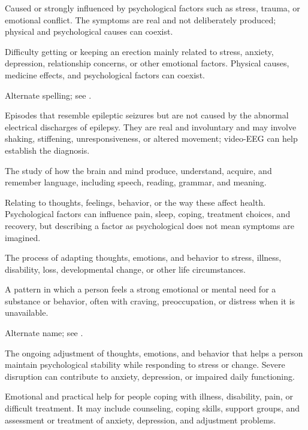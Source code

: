  Caused or strongly influenced by psychological factors such as stress, trauma, or emotional conflict. The symptoms are real and not deliberately produced; physical and psychological causes can coexist.

 Difficulty getting or keeping an erection mainly related to stress, anxiety, depression, relationship concerns, or other emotional factors. Physical causes, medicine effects, and psychological factors can coexist.

 Alternate spelling; see .

 Episodes that resemble epileptic seizures but are not caused by the abnormal electrical discharges of epilepsy. They are real and involuntary and may involve shaking, stiffening, unresponsiveness, or altered movement; video-EEG can help establish the diagnosis.

 The study of how the brain and mind produce, understand, acquire, and remember language, including speech, reading, grammar, and meaning.

 Relating to thoughts, feelings, behavior, or the way these affect health. Psychological factors can influence pain, sleep, coping, treatment choices, and recovery, but describing a factor as psychological does not mean symptoms are imagined.

 The process of adapting thoughts, emotions, and behavior to stress, illness, disability, loss, developmental change, or other life circumstances.

 A pattern in which a person feels a strong emotional or mental need for a substance or behavior, often with craving, preoccupation, or distress when it is unavailable.

 Alternate name; see .

 The ongoing adjustment of thoughts, emotions, and behavior that helps a person maintain psychological stability while responding to stress or change. Severe disruption can contribute to anxiety, depression, or impaired daily functioning.

 Emotional and practical help for people coping with illness, disability, pain, or difficult treatment. It may include counseling, coping skills, support groups, and assessment or treatment of anxiety, depression, and adjustment problems.

